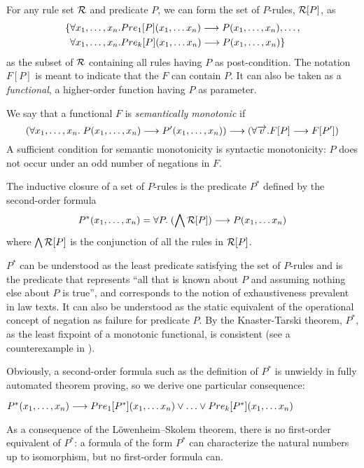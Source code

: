 For any rule set $\cal R$ and predicate $P$, we can form the set of
$P$-rules, ${\cal R}[P]$, as
\begin{align*}
\{ & \forall x_1, \dots, x_n. Pre_1[P](x_1, \dots x_n) \longrightarrow P(x_1, \dots, x_n),
     \dots,\\
  & \forall x_1, \dots, x_n.Pre_k[P](x_1, \dots x_n)\longrightarrow P(x_1, \dots,
x_n)\}
\end{align*}
as the subset of $\cal R$ containing all rules having $P$ as
post-condition. The notation $F[P]$ is meant to indicate that the $F$ can
contain $P$. It can also be taken as a \emph{functional}, \ie{} a higher-order
function having $P$ as parameter.

We say that a functional $F$ is \emph{semantically monotonic} if
\[
  (\forall x_1, \dots, x_n.\; P(x_1, \dots, x_n) \longrightarrow P'(x_1, \dots, x_n)) \longrightarrow 
  (\forall \overrightarrow{v}. F[P] \longrightarrow F[P'])
\]
A sufficient condition for semantic monotonicity is syntactic monotonicity:
$P$ does not occur under an odd number of negations in $F$. 

The inductive closure of a set of $P$-rules is the predicate $P^*$ defined by
the second-order formula
\[  P^*(x_1, \dots, x_n) = \forall P.\; (\bigwedge{\cal R}[P]) \longrightarrow P(x_1, \dots x_n) \]
where $\bigwedge{\cal R}[P]$ is the conjunction of all the rules in ${\cal R}[P]$.

$P^*$ can be understood as the least predicate satisfying the set of $P$-rules
and is the predicate that represents ``all that is known about $P$ and
assuming nothing else about $P$ is true'', and corresponds to the notion of
exhaustiveness prevalent in law texts. It can also be understood as the static
equivalent of the operational concept of negation as failure for predicate
$P$.  By the Knaster-Tarski theorem, $P^*$, as the least fixpoint of a
monotonic functional, is consistent (see a counterexample in
). 

Obviously, a second-order formula such as the definition of $P^*$ is unwieldy
in fully automated theorem proving, so we derive one particular consequence:

\begin{lemma}\label{lemma:p_star}
$P^*(x_1, \dots, x_n) \IMPL Pre_1[P^*](x_1, \dots x_n) \OR \dots \OR Pre_k[P^*](x_1, \dots x_n)$
\end{lemma}
As a consequence of the Löwenheim–Skolem theorem, there is no first-order
equivalent of $P^*$: a formula of the form $P^*$ can characterize the natural
numbers up to isomorphism, but no first-order formula can.

